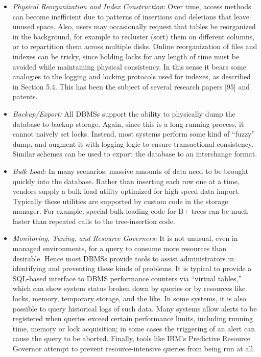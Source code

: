 \documentclass[a4paper,11pt,twoside,openright]{book}
\begin{document}
\begin{itemize}
\item
  \emph{Physical Reorganization and Index Construction}: Over time,
  access methods can become inefficient due to patterns of insertions
  and deletions that leave unused space. Also, users may occasionally
  request that tables be reorganized in the background, for example to
  recluster (sort) them on different columns, or to repartition them
  across multiple disks. Online reorganization of files and indexes can
  be tricky, since holding locks for any length of time must be avoided
  while maintaining physical consistency. In this sense it bears some
  analogies to the logging and locking protocols used for indexes, as
  described in Section 5.4. This has been the subject of several
  research papers {[}95{]} and patents.
\item
  \emph{Backup/Export:} All DBMSs support the ability to physically
  dump the database to backup storage. Again, since this is a
  long-running process, it cannot naively set locks. Instead, most
  systems perform some kind of ``fuzzy'' dump, and augment it with
  logging logic to ensure transactional consistency. Similar schemes can
  be used to export the database to an interchange format.
\item
  \emph{Bulk Load:} In many scenarios, massive amounts of data need to
  be brought quickly into the database. Rather than inserting each row
  one at a time, vendors supply a bulk load utility optimized for high
  speed data import. Typically these utilities are supported by custom
  code in the storage manager. For example, special bulk-loading code
  for B+-trees can be much faster than repeated calls to the
  tree-insertion code.
\item
  \emph{Monitoring, Tuning, and Resource Governers:} It is not unusual,
  even in managed environments, for a query to consume more resources
  than desirable. Hence most DBMSs provide tools to assist
  administrators in identifying and preventing these kinds of problems.
  It is typical to provide a SQL-based interface to DBMS performance
  counters via ``virtual tables,'' which can show system status broken
  down by queries or by resources like locks, memory, temporary storage,
  and the like. In some systems, it is also possible to query historical
  logs of such data. Many systems allow alerts to be registered when
  queries exceed certain performance limits, including running time,
  memory or lock acquisition; in some cases the triggering of an alert
  can cause the query to be aborted. Finally, tools like IBM's
  Predictive Resource Governor attempt to prevent resource-intensive
  queries from being run at all.
\end{itemize}
\end{document}
